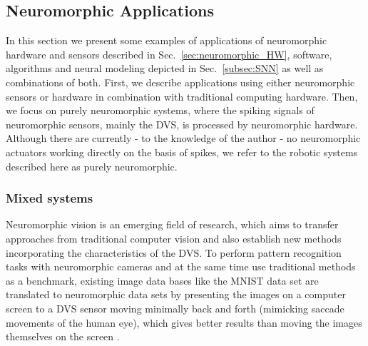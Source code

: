 \subsection{Neuromorphic Applications}
\label{subsec:neuro_applic}

In this section we present some examples of applications of neuromorphic hardware and sensors described in Sec.~\ref{sec:neuromorphic_HW}, software, algorithms and neural modeling depicted in Sec.~\ref{subsec:SNN} as well as combinations of both.
First, we describe applications using either neuromorphic sensors or hardware in combination with traditional computing hardware.
Then, we focus on purely neuromorphic systems, where the spiking signals of neuromorphic sensors, mainly the \ac{DVS}, is processed by neuromorphic hardware.
Although there are currently - to the knowledge of the author - no neuromorphic actuators working directly on the basis of spikes, we refer to the robotic systems described here as purely neuromorphic.

\subsubsection{Mixed systems}
\label{subsubsec:mixed_sys}

Neuromorphic vision \parencite{Tan2015, Gallego2019} is an emerging field of research, which aims to transfer approaches from traditional computer vision and also establish new methods incorporating the characteristics of the \ac{DVS}.
To perform pattern recognition tasks with neuromorphic cameras and at the same time use traditional methods as a benchmark, existing image data bases like the \ac{MNIST} data set \parencite{LeCun1998} are translated to neuromorphic data sets by presenting the images on a computer screen to a \ac{DVS} sensor moving minimally back and forth \parencite{Orchard2015} (mimicking saccade movements of the human eye), which gives better results than moving the images themselves on the screen \parencite{Serrano-Gotarredona2013}.

